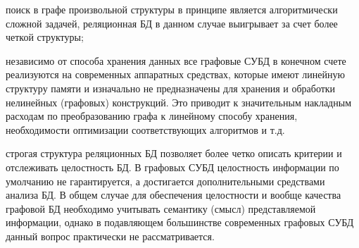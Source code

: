 \begin{SCn}
{\begin{scnitemize}
		\begin{scnitemizeii}
			
			\item поиск в графе произвольной структуры в принципе является алгоритмически сложной задачей, реляционная БД в данном случае выигрывает за счет более четкой структуры;
			
			\item независимо от способа хранения данных все графовые СУБД в конечном счете реализуются на современных аппаратных средствах, которые имеют линейную структуру памяти и изначально не предназначены для хранения и обработки нелинейных (графовых) конструкций. Это приводит к значительным накладным расходам по преобразованию графа к линейному способу хранения, необходимости оптимизации соответствующих алгоритмов и т.д.
			
		\end{scnitemizeii}
		
		\item строгая структура реляционных БД позволяет более четко описать критерии и отслеживать целостность БД. В графовых СУБД целостность информации по умолчанию не гарантируется, а достигается дополнительными средствами анализа БД. В общем случае для обеспечения целостности и вообще качества графовой БД необходимо учитывать семантику (смысл) представляемой информации, однако в подавляющем большинстве современных графовых СУБД данный вопрос практически не рассматривается.
	\end{scnitemize}
}

\bigskip

\scnendstruct \scnendcurrentsectioncomment

\end{SCn}
